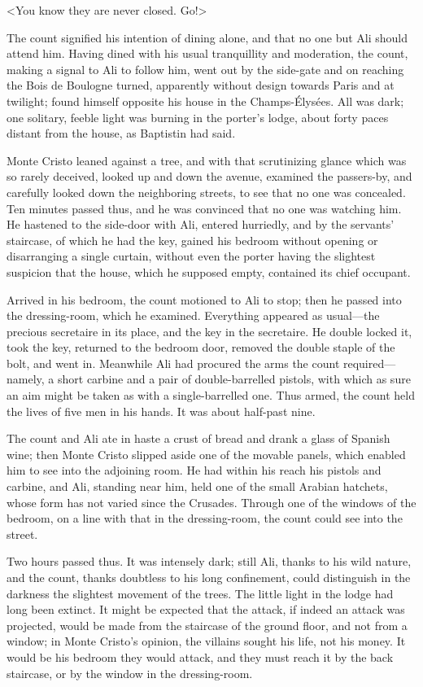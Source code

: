  <You know they are never closed. Go!> 

 The count signified his intention of dining alone, and that no one but Ali should attend him. Having dined with his usual tranquillity and moderation, the count, making a signal to Ali to follow him, went out by the side-gate and on reaching the Bois de Boulogne turned, apparently without design towards Paris and at twilight; found himself opposite his house in the Champs-Élysées. All was dark; one solitary, feeble light was burning in the porter's lodge, about forty paces distant from the house, as Baptistin had said. 

 Monte Cristo leaned against a tree, and with that scrutinizing glance which was so rarely deceived, looked up and down the avenue, examined the passers-by, and carefully looked down the neighboring streets, to see that no one was concealed. Ten minutes passed thus, and he was convinced that no one was watching him. He hastened to the side-door with Ali, entered hurriedly, and by the servants' staircase, of which he had the key, gained his bedroom without opening or disarranging a single curtain, without even the porter having the slightest suspicion that the house, which he supposed empty, contained its chief occupant. 

 Arrived in his bedroom, the count motioned to Ali to stop; then he passed into the dressing-room, which he examined. Everything appeared as usual—the precious secretaire in its place, and the key in the secretaire. He double locked it, took the key, returned to the bedroom door, removed the double staple of the bolt, and went in. Meanwhile Ali had procured the arms the count required—namely, a short carbine and a pair of double-barrelled pistols, with which as sure an aim might be taken as with a single-barrelled one. Thus armed, the count held the lives of five men in his hands. It was about half-past nine. 

 The count and Ali ate in haste a crust of bread and drank a glass of Spanish wine; then Monte Cristo slipped aside one of the movable panels, which enabled him to see into the adjoining room. He had within his reach his pistols and carbine, and Ali, standing near him, held one of the small Arabian hatchets, whose form has not varied since the Crusades. Through one of the windows of the bedroom, on a line with that in the dressing-room, the count could see into the street. 

 Two hours passed thus. It was intensely dark; still Ali, thanks to his wild nature, and the count, thanks doubtless to his long confinement, could distinguish in the darkness the slightest movement of the trees. The little light in the lodge had long been extinct. It might be expected that the attack, if indeed an attack was projected, would be made from the staircase of the ground floor, and not from a window; in Monte Cristo's opinion, the villains sought his life, not his money. It would be his bedroom they would attack, and they must reach it by the back staircase, or by the window in the dressing-room. 

